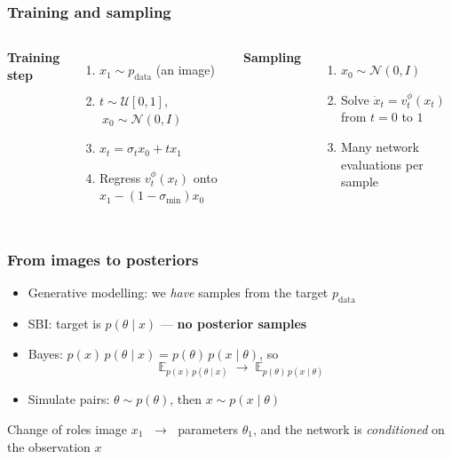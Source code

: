 \documentclass[handout]{beamer}
\begin{document}
\begin{frame}
	\frametitle{Training and sampling}
	\begin{columns}[T]
			\textbf{Training step}
			\begin{enumerate}
				\item $x_1 \sim p_{\text{data}}$ (an image)
				\item $t \sim \mathcal{U}[0,1]$, $\ x_0 \sim \mathcal{N}(0,I)$
				\item $x_t = \sigma_t x_0 + t x_1$
				\item Regress $v^{\phi}_t(x_t)$ onto $x_1 - (1-\sigma_{\min}) x_0$
			\end{enumerate}
			\textbf{Sampling}
			\begin{enumerate}
				\item $x_0 \sim \mathcal{N}(0,I)$
				\item Solve $\dot{x}_t = v^{\phi}_t(x_t)$ from $t = 0$ to $1$
				\item Many network evaluations per sample
			\end{enumerate}
	\end{columns}
\end{frame}

\begin{frame}
	\frametitle{From images to posteriors}
	\begin{itemize}
		\item Generative modelling: we \emph{have} samples from the target $p_{\text{data}}$
		\item SBI: target is $p(\theta \mid x)$ --- \textbf{no posterior samples}
		\item Bayes: $p(x)\,p(\theta \mid x) = p(\theta)\,p(x \mid \theta)$, so
		\[
			\mathbb{E}_{p(x)\,p(\theta \mid x)} \;\longrightarrow\; \mathbb{E}_{p(\theta)\,p(x \mid \theta)}
		\]
		\item Simulate pairs: $\theta \sim p(\theta)$, then $x \sim p(x \mid \theta)$
	\end{itemize}
	\begin{block}{Change of roles}
		image $x_1$ $\;\to\;$ parameters $\theta_1$, \quad and the network is \emph{conditioned} on the observation $x$
	\end{block}
\end{frame}
\end{document}
